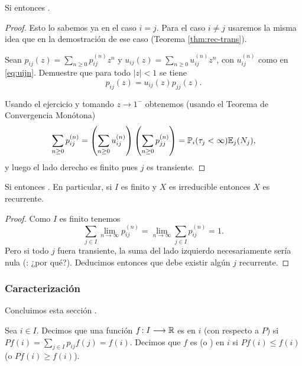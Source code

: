 \begin{prop}
Si  entonces .
\end{prop}

\begin{proof}
Esto lo sabemos ya en el caso $i=j$.
Para el caso $i\neq j$ usaremos la misma idea que en la demostración de ese caso (Teorema \ref{thm:rec-trans}).
\begin{exer}
Sean $p_{ij}(z)=\sum_{n\geq0}p^{(n)}_{ij}z^n$ y $u_{ij}(z)=\sum_{n\geq0}u^{(n)}_{ij}z^n$, con $u^{(n)}_{ij}$ como en \eqref{eq:uijn}.
Demuestre que para todo $|z|<1$ se tiene
\[p_{ij}(z)=u_{ij}(z)p_{jj}(z).\]
\end{exer}
\noindent Usando el ejercicio y tomando $z\to1^-$ obtenemos (usando el Teorema de Convergencia Monótona)
\[\sum_{n\geq0}p_{ij}^{(n)}=\left(\sum_{n\geq0}u_{ij}^{(n)}\right)\left(\sum_{n\geq0}p_{jj}^{(n)}\right)=\mathbb{P}_i(\tau_j<\infty)\mathbb{E}_j(N_j),\]
y luego el lado derecho es finito pues $j$ es transiente.
\end{proof}

\begin{cor}\label{cor:finito-rec}
Si  entonces .
En particular, si $I$ es finito y $X$ es irreducible entonces $X$ es recurrente.
\end{cor}

\begin{proof}
Como $I$ es finito tenemos
\[\textstyle\sum_{j\in I}\lim_{n\to\infty}p^{(n)}_{ij}=\lim_{n\to\infty}\sum_{j\in I}p^{(n)}_{ij}=1.\]
Pero si todo $j$ fuera transiente, la suma del lado izquierdo necesariamente sería nula (\uexers: ¿por qué?).
Deducimos entonces que debe existir algún $j$ recurrente.
\end{proof}

\subsubsection{Caracterización}

Concluimos esta sección .

\begin{defn}
Sea $i\in I$.
Decimos que una función $f\!:I\longrightarrow\mathbb{R}$ es \emph{} en $i$ (con respecto a $P$) si $Pf(i)=\sum_{j\in I}p_{ij}f(j)=f(i)$.
Decimos que $f$ es \emph{} (o \emph{}) en $i$ si $Pf(i)\leq f(i)$ (o $Pf(i)\geq f(i)$).
\end{defn}

